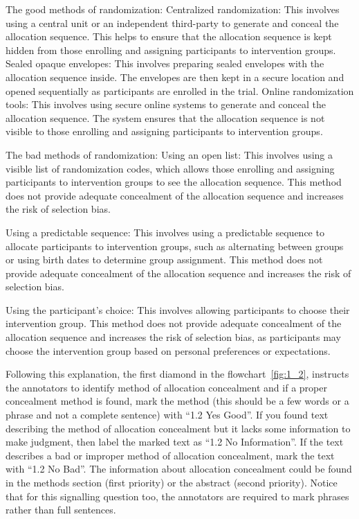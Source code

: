 \documentclass[sn-mathphys,Numbered]{sn-jnl}%
\begin{document}
The good methods of randomization:
Centralized randomization: This involves using a central unit or an independent third-party to generate and conceal the allocation sequence. This helps to ensure that the allocation sequence is kept hidden from those enrolling and assigning participants to intervention groups.
Sealed opaque envelopes: This involves preparing sealed envelopes with the allocation sequence inside. The envelopes are then kept in a secure location and opened sequentially as participants are enrolled in the trial.
Online randomization tools: This involves using secure online systems to generate and conceal the allocation sequence. The system ensures that the allocation sequence is not visible to those enrolling and assigning participants to intervention groups.

The bad methods of randomization:
Using an open list: This involves using a visible list of randomization codes, which allows those enrolling and assigning participants to intervention groups to see the allocation sequence. This method does not provide adequate concealment of the allocation sequence and increases the risk of selection bias.

Using a predictable sequence: This involves using a predictable sequence to allocate participants to intervention groups, such as alternating between groups or using birth dates to determine group assignment. This method does not provide adequate concealment of the allocation sequence and increases the risk of selection bias.

Using the participant's choice: This involves allowing participants to choose their intervention group. This method does not provide adequate concealment of the allocation sequence and increases the risk of selection bias, as participants may choose the intervention group based on personal preferences or expectations.


Following this explanation, the first diamond in the flowchart~\ref{fig:1_2}, instructs the annotators to identify method of allocation concealment and if a proper concealment method is found, mark the method (this should be a few words or a phrase and not a complete sentence) with ``1.2 Yes Good''.
If you found text describing the method of allocation concealment but it lacks some information to make judgment, then label the marked text as ``1.2 No Information''.
If the text describes a bad or improper method of allocation concealment, mark the text with ``1.2 No Bad''.
The information about allocation concealment could be found in the methods section (first priority) or the abstract (second priority).
Notice that for this signalling question too, the annotators are required to mark phrases rather than full sentences.
%
%
%
\end{document}
